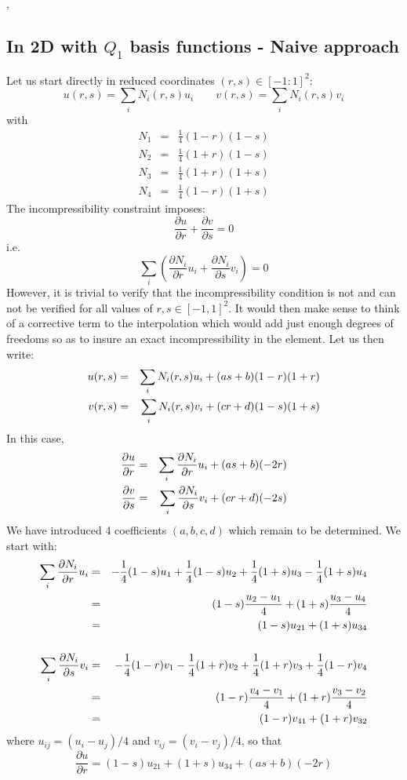 

\Literature \cite{pukp16},\cite{mcna11} \cite{waav15}

\subsection{In 2D with $Q_1$ basis functions - Naive approach}

Let us start directly in reduced coordinates $(r,s)\in [-1:1]^2$:
\[
u(r,s)=\sum_i N_i(r,s) u_i
\quad
\quad
v(r,s)=\sum_i N_i(r,s) v_i
\]
with 
\begin{eqnarray}
N_1&=& \frac{1}{4}(1-r)(1-s)  \nonumber\\ 
N_2&=& \frac{1}{4}(1+r)(1-s)  \nonumber\\ 
N_3&=& \frac{1}{4}(1+r)(1+s)  \nonumber\\ 
N_4&=& \frac{1}{4}(1-r)(1+s)  \nonumber
\end{eqnarray}
The incompressibility constraint imposes:
\[
\frac{\partial u}{\partial r}+
\frac{\partial v}{\partial s}=0
\]
i.e.
\[
\sum_i \left(  
\frac{\partial N_i}{\partial r} u_i+
\frac{\partial N_i}{\partial s} v_i
\right)
=0
\]
However, it is trivial to verify that the incompressibility 
condition is not and can not be verified for all values of  
$r,s \in [-1,1]^2$.
It would then make sense to think of a corrective term to the interpolation
which would add just enough degrees of freedoms so as to insure an exact
incompressibility in the element. 
Let us then write:
\begin{eqnarray}
u(r,s)&=&\sum_i N_i(r,s) u_i + (a s + b)(1-r)(1+r) \nonumber\\
v(r,s)&=&\sum_i N_i(r,s) v_i + (c r + d)(1-s)(1+s) \nonumber
\end{eqnarray}
In this case,
\begin{eqnarray}
\frac{\partial u}{\partial r}&=&\sum_i \frac{\partial N_i}{\partial r} u_i + (a s + b) (-2r) \nonumber\\
\frac{\partial v}{\partial s}&=&\sum_i \frac{\partial N_i}{\partial s} v_i + (c r + d)(-2s) \nonumber
\end{eqnarray}
We have introduced 4 coefficients  $(a,b,c,d)$ which remain to be determined. 
We start with:
\begin{eqnarray}
\sum_i \frac{\partial N_i}{\partial r} u_i 
&=& -\frac{1}{4} (1-s) u_1 + \frac{1}{4} (1-s) u_2 +\frac{1}{4} (1+s) u_3 -\frac{1}{4} (1+s) u_4 \nonumber\\
&=& (1-s) \frac{u_2-u_1}{4} + (1+s) \frac{u_3-u_4}{4} \nonumber\\
&=& (1-s) u_{21} + (1+s) u_{34} \nonumber\\
\nonumber\\
\sum_i \frac{\partial N_i}{\partial s} v_i 
&=& -\frac{1}{4} (1-r) v_1 - \frac{1}{4} (1+r) v_2 +\frac{1}{4} (1+r) v_3 +\frac{1}{4} (1-r) v_4 \nonumber\\
&=& (1-r) \frac{v_4-v_1}{4} + (1+r)\frac{v_3-v_2}{4} \nonumber\\
&=& (1-r) v_{41} + (1+r) v_{32} \nonumber
\end{eqnarray}
where $u_{ij}=(u_i-u_j)/4$ and $v_{ij}=(v_i-v_j)/4$, so that
\[
\frac{\partial u}{\partial r}=
(1-s) u_{21} + (1+s) u_{34} 
+ (a s + b) (-2r)
\]

